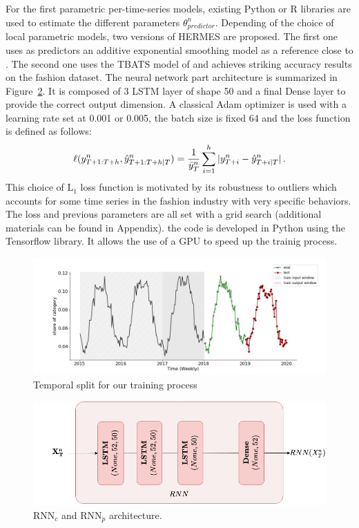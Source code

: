 \documentclass{article} %
\newcommand{\ts}{y}
\newcommand{\tspred}{\hat{\ts}}
\newcommand{\statparam}{\theta_{predictor}}
\newcommand{\lag}{h}
\newcommand{\meants}{\Bar{\ts}}
\newcommand{\predictor}{\mathrm{RNN}_p}
\newcommand{\classifier}{\mathrm{RNN}_c}
\begin{document}
For the first parametric per-time-series models, existing Python or R libraries are used to estimate the different parameters $\statparam^n$. %
Depending of the choice of local parametric models, two versions of HERMES are proposed. The first one uses as predictors an additive exponential smoothing model as a reference close to \cite{smyl2020hybrid}. The second one uses the TBATS model of \cite{doi:10.1198/jasa.2011.tm09771} and  achieves striking accuracy results on the fashion dataset. The neural network part architecture is summarized in Figure~\ref{fig:rnn_architecture}. It is composed of 3 LSTM layer of shape 50 and a final Dense layer to provide the correct output dimension. A classical Adam optimizer is used with a learning rate set at 0.001 or 0.005, the batch size is fixed 64 and the loss function is defined as follows:
$$
\ell(\ts^n_{T+1:T+\lag},\tspred^n_{T+1:T+\lag|T}) = \frac{1}{\meants^n_T}\sum_{i=1}^{\lag}|\ts^n_{T+i} - \tspred^n_{T+i|T}|\,.
$$
This choice of $\mathrm{L}_1$  loss function is motivated by its robustness to outliers which accounts for some time series in the fashion industry with very specific behaviors. The loss and previous parameters are all set with a grid search (additional materials can be found in Appendix). the code is developed in Python using the Tensorflow library. It allows the use of a GPU to speed up the trainig process.



\begin{figure}
  \centering
    \includegraphics[width=1.\linewidth]{figure/train_eval_test_set}
  \caption{Temporal split for our training process}
\label{fig:train_eval_test_set}
\end{figure}

\begin{figure}
  \centering
    \includegraphics[width=0.8\linewidth]{figure/lstm_archi}
  \caption{$\classifier$ and $\predictor$ architecture.}
\label{fig:rnn_architecture}
\end{figure}
\end{document}
